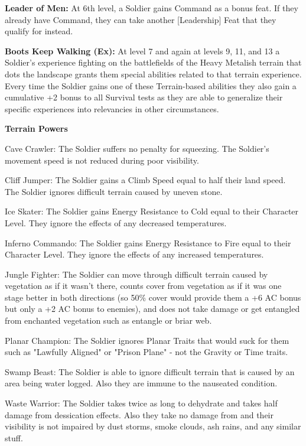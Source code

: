 \textbf{Leader of Men:} At 6th level, a Soldier gains Command as a bonus feat. If they already have Command, they can take another [Leadership] Feat that they qualify for instead.

\textbf{Boots Keep Walking (Ex):} At level 7 and again at levels 9, 11, and 13 a Soldier's experience fighting on the battlefields of the Heavy Metalish terrain that dots the landscape grants them special abilities related to that terrain experience. Every time the Soldier gains one of these Terrain-based abilities they also gain a cumulative +2 bonus to all Survival tests as they are able to generalize their specific experiences into relevancies in other circumstances.

\textbf{Terrain Powers}
\begin{description*}
\item[Cave Crawler:] The Soldier suffers no penalty for squeezing. The Soldier's movement speed is not reduced during poor visibility.
\item[Cliff Jumper:] The Soldier gains a Climb Speed equal to half their land speed. The Soldier ignores difficult terrain caused by uneven stone.
\item[Ice Skater:] The Soldier gains Energy Resistance to Cold equal to their Character Level. They ignore the effects of any decreased temperatures.
\item[Inferno Commando:] The Soldier gains Energy Resistance to Fire equal to their Character Level. They ignore the effects of any increased temperatures.
\item[Jungle Fighter:] The Soldier can move through difficult terrain caused by vegetation as if it wasn't there, counts cover from vegetation as if it was one stage better in both directions (so 50\% cover would provide them a +6 AC bonus but only a +2 AC bonus to enemies), and does not take damage or get entangled from enchanted vegetation such as entangle or briar web.
\item[Planar Champion:] The Soldier ignores Planar Traits that would suck for them such as "Lawfully Aligned" or "Prison Plane" - not the Gravity or Time traits.
\item[Swamp Beast:] The Soldier is able to ignore difficult terrain that is caused by an area being water logged. Also they are immune to the nauseated condition.
\item[Waste Warrior:] The Soldier takes twice as long to dehydrate and takes half damage from dessication effects. Also they take no damage from and their visibility is not impaired by dust storms, smoke clouds, ash rains, and any similar stuff.
\end{description*}

